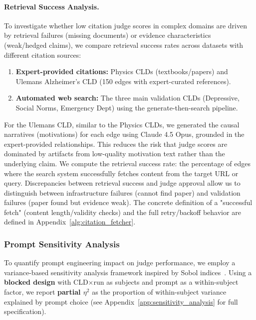 \paragraph{Retrieval Success Analysis.}
To investigate whether low citation judge scores in complex domains are driven by retrieval failures (missing documents) or evidence characteristics (weak/hedged claims), we compare retrieval success rates across datasets with different citation sources:
\begin{enumerate}[noitemsep]
    \item \textbf{Expert-provided citations:} Physics CLDs (textbooks/papers) and Ulemans Alzheimer's CLD (150 edges with expert-curated references).
    \item \textbf{Automated web search:} The three main validation CLDs (Depressive, Social Norms, Emergency Dept) using the generate-then-search pipeline.
\end{enumerate}
For the Ulemans CLD, similar to the Physics CLDs, we generated the causal narratives (motivations) for each edge using Claude 4.5 Opus, grounded in the expert-provided relationships. This reduces the risk that judge scores are dominated by artifacts from low-quality motivation text rather than the underlying claim.
We compute the retrieval success rate: the percentage of edges where the search system successfully fetches content from the target URL or query. Discrepancies between retrieval success and judge approval allow us to distinguish between infrastructure failures (cannot find paper) and validation failures (paper found but evidence weak).
The concrete definition of a "successful fetch" (content length/validity checks) and the full retry/backoff behavior are defined in Appendix~\ref{alg:citation_fetcher}.

\subsubsection{Prompt Sensitivity Analysis}
\label{sec:rq1a_sensitivity}

To quantify prompt engineering impact on judge performance, we employ a variance-based sensitivity analysis framework inspired by Sobol indices~\cite{sobol1993sensitivity}. Using a \textbf{blocked design} with CLD$\times$run as subjects and prompt as a within-subject factor, we report \textbf{partial $\eta^2$} as the proportion of within-subject variance explained by prompt choice (see Appendix~\ref{app:sensitivity_analysis} for full specification).

